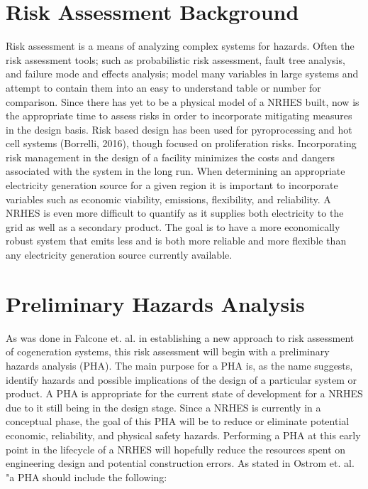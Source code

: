 \documentclass[12pt]{UIdahoMastersThesis}
\begin{document}
\section{Risk Assessment Background}
Risk assessment is a means of analyzing complex systems for hazards. Often the risk assessment tools; such as probabilistic risk assessment, fault tree analysis, and failure mode and effects analysis; model many variables in large systems and attempt to contain them into an easy to understand table or number for comparison. Since there has yet to be a physical model of a NRHES built, now is the appropriate time to assess risks in order to incorporate mitigating measures in the design basis. Risk based design has been used for pyroprocessing and hot cell systems (Borrelli, 2016), though focused on proliferation risks. Incorporating risk management in the design of a facility minimizes the costs and dangers associated with the system in the long run.
	When determining an appropriate electricity generation source for a given region it is important to incorporate variables such as economic viability, emissions, flexibility, and reliability. A NRHES is even more difficult to quantify as it supplies both electricity to the grid as well as a secondary product. The goal is to have a more economically robust system that emits less and is both more reliable and more flexible than any electricity generation source currently available.

\section{Preliminary Hazards Analysis}
As was done in Falcone et. al. in establishing a new approach to risk assessment of cogeneration systems, this risk assessment will begin with a preliminary hazards analysis (PHA). The main purpose for a PHA is, as the name suggests, identify hazards and possible implications of the design of a particular system or product.  A PHA is appropriate for the current state of development for a NRHES due to it still being in the design stage. Since a NRHES is currently in a conceptual phase, the goal of this PHA will be to reduce or eliminate potential economic, reliability, and physical safety hazards. Performing a PHA at this early point in the lifecycle of a NRHES will hopefully reduce the resources spent on engineering design and potential construction errors. As stated in Ostrom et. al.  "a PHA should include the following:
\end{document}
